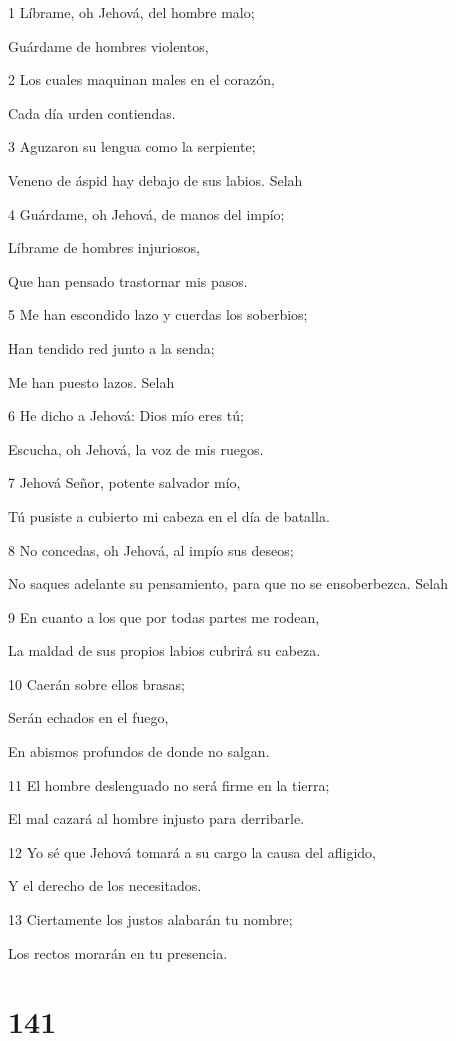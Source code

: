 \par 1 Líbrame, oh Jehová, del hombre malo;
\par Guárdame de hombres violentos,
\par 2 Los cuales maquinan males en el corazón,
\par Cada día urden contiendas.
\par 3 Aguzaron su lengua como la serpiente;
\par Veneno de áspid hay debajo de sus labios. Selah
\par 4 Guárdame, oh Jehová, de manos del impío;
\par Líbrame de hombres injuriosos,
\par Que han pensado trastornar mis pasos.
\par 5 Me han escondido lazo y cuerdas los soberbios;
\par Han tendido red junto a la senda;
\par Me han puesto lazos. Selah
\par 6 He dicho a Jehová: Dios mío eres tú;
\par Escucha, oh Jehová, la voz de mis ruegos.
\par 7 Jehová Señor, potente salvador mío,
\par Tú pusiste a cubierto mi cabeza en el día de batalla.
\par 8 No concedas, oh Jehová, al impío sus deseos;
\par No saques adelante su pensamiento, para que no se ensoberbezca. Selah
\par 9 En cuanto a los que por todas partes me rodean,
\par La maldad de sus propios labios cubrirá su cabeza.
\par 10 Caerán sobre ellos brasas;
\par Serán echados en el fuego,
\par En abismos profundos de donde no salgan.
\par 11 El hombre deslenguado no será firme en la tierra;
\par El mal cazará al hombre injusto para derribarle.
\par 12 Yo sé que Jehová tomará a su cargo la causa del afligido,
\par Y el derecho de los necesitados.
\par 13 Ciertamente los justos alabarán tu nombre;
\par Los rectos morarán en tu presencia.

\chapter{141}

